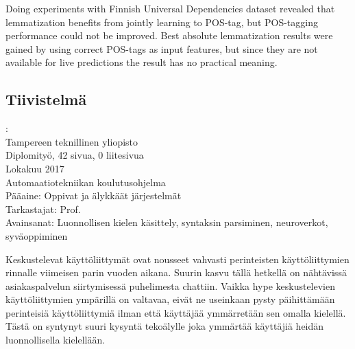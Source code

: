 \documentclass[12pt,a4paper,english
]{tutthesis}
\begin{document}
Doing experiments with Finnish Universal Dependencies dataset revealed that lemmatization benefits from jointly learning to POS-tag, but POS-tagging performance could not be improved. Best absolute lemmatization results were gained by using correct POS-tags as input features, but since they are not available for live predictions the result has no practical meaning.

 



\begin{otherlanguage}{finnish} %
\chapter*{Tiivistelmä} %

\begin{spacing}{1.0}
         {\bf \textsf{\MakeUppercase{\@author}}}: \@titleB\\  %
         \textsf{Tampereen teknillinen yliopisto}\\
         \textsf{Diplomityö, 42 sivua, 0 liitesivua}\\ %
         \textsf{Lokakuu 2017}\\
         \textsf{Automaatiotekniikan koulutusohjelma}\\
         \textsf{Pääaine: Oppivat ja älykkäät järjestelmät}\\
         \textsf{Tarkastajat: Prof. \@examiner}\\ %
         \textsf{Avainsanat: Luonnollisen kielen käsittely, syntaksin parsiminen, neuroverkot, syväoppiminen}\\
\end{spacing}

Keskustelevat käyttöliittymät ovat nousseet vahvasti perinteisten käyttöliittymien rinnalle viimeisen parin vuoden aikana. Suurin kasvu tällä hetkellä on nähtävissä asiakaspalvelun siirtymisessä puhelimesta chattiin. Vaikka hype keskustelevien käyttöliittymien ympärillä on valtavaa, eivät ne useinkaan pysty päihittämään perinteisiä käyttöliittymiä ilman että käyttäjää ymmärretään sen omalla kielellä. Tästä on syntynyt suuri kysyntä tekoälylle joka ymmärtää käyttäjiä heidän luonnollisella kielellään.


\end{otherlanguage}
\end{document}
